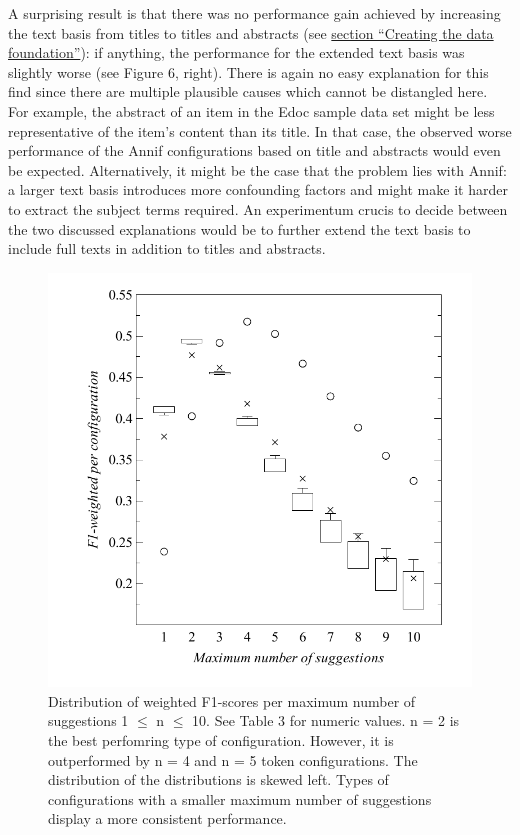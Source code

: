 A surprising result is that there was no performance gain achieved by
increasing the text basis from titles to titles and abstracts (see
\protect\hyperlink{creating-the-data-foundation}{section ``Creating the
data foundation''}): if anything, the performance for the extended text
basis was slightly worse (see Figure 6, right). There is again no easy
explanation for this find since there are multiple plausible causes
which cannot be distangled here. For example, the abstract of an item in
the Edoc sample data set might be less representative of the item's
content than its title. In that case, the observed worse performance of
the Annif configurations based on title and abstracts would even be
expected. Alternatively, it might be the case that the problem lies with
Annif: a larger text basis introduces more confounding factors and might
make it harder to extract the subject terms required. An experimentum
crucis to decide between the two discussed explanations would be to
further extend the text basis to include full texts in addition to
titles and abstracts.

\begin{figure}
\centering
\includegraphics{images/metrics_all_n.pdf}
\caption{Distribution of weighted F1-scores per maximum number of
suggestions 1 \(\leq\) n \(\leq\) 10. See Table 3 for numeric values. n
= 2 is the best perfomring type of configuration. However, it is
outperformed by n = 4 and n = 5 token configurations. The distribution
of the distributions is skewed left. Types of configurations with a
smaller maximum number of suggestions display a more consistent
performance.}
\end{figure}

